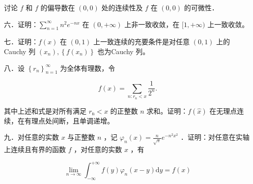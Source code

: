 \documentclass{article}
\begin{document}
讨论 \(f\) 和 \(f\) 的偏导数在 \((0,0)\) 处的连续性及 \(f\) 在 \((0,0)\) 的可微性．

六．证明：\(\sum_{n=1}^{\infty} n^{2} e^{-n x}\) 在 \((0,+\infty)\) 上非一致收敛，在 \([1,+\infty)\) 上一致收敛。

七．证明：\(f(x)\) 在 \((0,1)\) 上一致连续的充要条件是对任意 \((0,1)\) 上的 Cauchy 列 \(\left(x_{n}\right),\left\{f\left(x_{n}\right)\right\}\) 也为Cauchy 列。

八．设 \(\left\{r_{n}\right\}_{n=1}^{\infty}\) 为全体有理数，令

\[
f(x)=\sum_{n: r_{n}<x} \frac{1}{2^{n}} .
\]

其中上述和式是对所有满足 \(r_{\mathrm{n}}<x\) 的正整数 \(n\) 求和。证明：\(f(\hat{x})\) 在无理点连续，在有理点处间断，且单调递增。

九．对任意的实数 \(x\) 与正整数 \(n\) ，记 \(\varphi_{n}(x)=\frac{n}{\sqrt{\pi}} e^{-n^{2} x^{2}}\) ．证明：对任意在实轴上连续且有界的函数 \(f\) ，对任意的实数 \(x\) ，有

\[
\lim _{n \rightarrow \infty} \int_{-\infty}^{+\infty} f(y) \varphi_{n}(x-y) \mathrm{d} y=f(x)
\]
\end{document}
